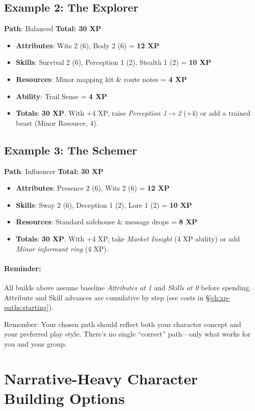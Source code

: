 \subsection*{Example 2: The Explorer}
\textbf{Path}: Balanced \quad \textbf{Total: 30 XP}
\begin{itemize}
\item \textbf{Attributes}: Wits 2 (6), Body 2 (6) = \textbf{12 XP}
\item \textbf{Skills}: Survival 2 (6), Perception 1 (2), Stealth 1 (2) = \textbf{10 XP}
\item \textbf{Resources}: Minor mapping kit \& route notes = \textbf{4 XP}
\item \textbf{Ability}: Trail Sense = \textbf{4 XP}
\item \textbf{Totals}: \textbf{30 XP}. With +4 XP, raise \emph{Perception 1$\to$2} (+4) or add a trained beast (Minor Resource, 4).
\end{itemize}

\subsection*{Example 3: The Schemer}
\textbf{Path}: Influencer \quad \textbf{Total: 30 XP}
\begin{itemize}
\item \textbf{Attributes}: Presence 2 (6), Wits 2 (6) = \textbf{12 XP}
\item \textbf{Skills}: Sway 2 (6), Deception 1 (2), Lore 1 (2) = \textbf{10 XP}
\item \textbf{Resources}: Standard safehouse \& message drops = \textbf{8 XP}
\item \textbf{Totals}: \textbf{30 XP}. With +4 XP, take \emph{Market Insight} (4 XP ability) or add \emph{Minor informant ring} (4 XP).
\end{itemize}

\paragraph{Reminder:}
All builds above assume baseline \emph{Attributes at 1} and \emph{Skills at 0} before spending. Attribute and Skill advances are cumulative by step (see costs in \S\ref{ch:xp-paths:starting}).

Remember: Your chosen path should reflect both your character concept and your preferred play style. There's no single ``correct'' path—only what works for you and your group.

\section{Narrative-Heavy Character Building Options}

